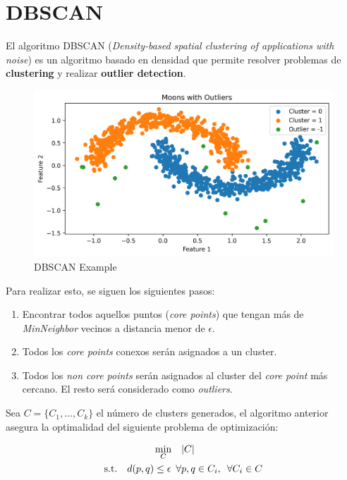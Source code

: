 \section{DBSCAN}

El algoritmo DBSCAN (\textit{Density-based spatial clustering of applications with noise}) es un algoritmo basado en densidad que permite resolver problemas de \textbf{clustering} y realizar \textbf{outlier detection}. 

\begin{figure}[H]
    \center
    \includegraphics[scale=0.5]{notebooks/ML/img/dbscan_on_moons.png}
    \caption{DBSCAN Example}
\end{figure}

Para realizar esto, se siguen los siguientes pasos: 

\begin{enumerate}
    \item Encontrar todos aquellos puntos (\textit{core points}) que tengan más de \textit{MinNeighbor} vecinos a distancia menor de $\epsilon$. 
    \item Todos los \textit{core points} conexos serán asignados a un cluster. 
    \item Todos los \textit{non core points} serán asignados al cluster del \textit{core point} más cercano. El resto será considerado como \textit{outliers}. 
\end{enumerate}

Sea $C = \{ C_1 , \dots , C_{k} \}$ el número de clusters generados, el algoritmo anterior asegura la optimalidad del siguiente problema de optimización: 

\begin{equation*}
\begin{aligned}
\min_{C} \quad &|C| \\
\textrm{s.t.} \quad d(p,q) \leq \epsilon \hspace{0.5em} \forall &p,q \in C_i, \hspace{0.5em} \forall C_i \in C
\end{aligned}
\end{equation*}

